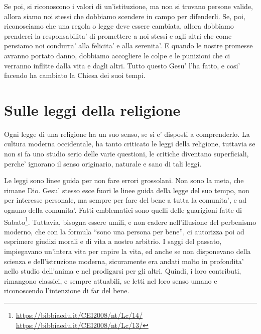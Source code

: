 Se poi, si riconoscono i valori di un'istituzione, ma non si trovano persone valide, allora siamo noi stessi che dobbiamo scendere in campo per difenderli. Se, poi, riconosciamo che una regola o legge deve essere cambiata, allora dobbiamo prenderci la responsabilita' di promettere a noi stessi e agli altri che come pensiamo noi condurra' alla felicita' e alla serenita'. E quando le nostre promesse avranno portato danno, dobbiamo accogliere le colpe e le punizioni che ci verranno inflitte dalla vita e dagli altri. Tutto questo Gesu' l'ha fatto, e cosi' facendo ha cambiato la Chiesa dei suoi tempi. 

\section{Sulle leggi della religione}

Ogni legge di una religione ha un suo senso, se si e' disposti a comprenderlo. La cultura moderna occidentale, ha tanto criticato le leggi della religione, tuttavia se non si fa uno studio serio delle varie questioni, le critiche diventano superficiali, perche' ignorano il senso originario, naturale e sano di tali leggi.

Le leggi sono linee guida per non fare errori grossolani. Non sono la meta, che rimane Dio. Gesu' stesso esce fuori le linee guida della legge del suo tempo, non per interesse personale, ma sempre per fare del bene a tutta la comunita', e ad ognuno della comunita'. Fatti emblematici sono quelli delle guarigioni fatte di Sabato\footnote{\url{https://bibbiaedu.it/CEI2008/nt/Lc/14/} \url{https://bibbiaedu.it/CEI2008/nt/Lc/13/}}. Tuttavia, bisogna essere umili, e non cadere nell'illusione del perbenismo moderno, che con la formula ``sono una persona per bene'', ci autorizza poi ad esprimere giudizi morali e di vita a nostro arbitrio. I saggi del passato, impiegavano un'intera vita per capire la vita, ed anche se non disponevano della scienza e dell'istruzione moderna, sicuramente era andati molto in profondita' nello studio dell'anima e nel prodigarsi per gli altri. Quindi, i loro contributi, rimangono classici, e sempre attuabili, se letti nel loro senso umano e riconoscendo l'intenzione di far del bene.

